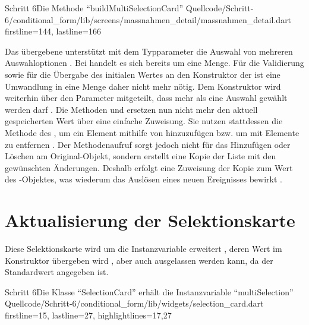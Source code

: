 \begin{alexlisting}{Schritt 6}{Die Methode \enquote{buildMultiSelectionCard}}
  {Quellcode/Schritt-6/conditional_form/lib/screens/massnahmen_detail/massnahmen_detail.dart}
  {firstline=144, lastline=166}
  \label{lst:Schritt6buildMultiSelectionCard}
\end{alexlisting}

Das übergebene  unterstützt mit dem Typparameter  die Auswahl von mehreren Auswahloptionen .
Bei  handelt es sich bereits um eine Menge.
Für die Validierung  sowie für die Übergabe des initialen Wertes an den Konstruktor der   ist eine Umwandlung in eine Menge daher nicht mehr nötig.
Dem Konstruktor  wird weiterhin über den Parameter  mitgeteilt, dass mehr als eine Auswahl gewählt werden darf .
Die Methoden  und  ersetzen nun nicht mehr den aktuell gespeicherten Wert über eine einfache Zuweisung.
Sie nutzen stattdessen die Methode  des , um ein Element mithilfe von  hinzuzufügen  bzw. um mit  Elemente zu entfernen .
Der Methodenaufruf  sorgt jedoch nicht für das Hinzufügen oder Löschen am Original-Objekt, sondern erstellt eine Kopie der Liste mit den gewünschten Änderungen.
Deshalb erfolgt eine Zuweisung der Kopie zum Wert des -Objektes, was wiederum das Auslösen eines neuen Ereignisses bewirkt .

\section{Aktualisierung der Selektionskarte}


Diese Selektionskarte wird um die Instanzvariable  erweitert ,
deren Wert im Konstruktor übergeben wird , aber auch ausgelassen werden kann, da der Standardwert  angegeben ist.

\begin{alexlisting}{Schritt 6}{Die Klasse \enquote{SelectionCard} erhält die Instanzvariable \enquote{multiSelection}}
  {Quellcode/Schritt-6/conditional_form/lib/widgets/selection_card.dart}
  {firstline=15, lastline=27, highlightlines={17,27}}
  \label{lst:Schritt6SelectionCard}
\end{alexlisting}


